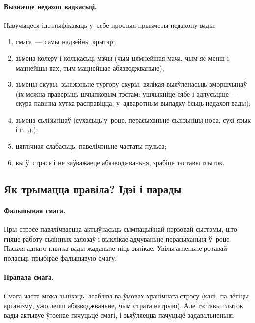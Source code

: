 \paragraph{Вызначце недахоп вадкасьці.} Навучыцеся ідэнтыфікаваць у~сябе простыя прыкметы недахопу вады:
\begin{enumerate}[itemindent=3em,labelwidth=1.5em,leftmargin=0pt,nosep]
  \item смага~--- самы надзейны крытэр;
  \item зьмена колеру і колькасьці мачы (чым цямнейшая мача, чым яе менш і мацнейшы пах, тым мацнейшае абязводжваньне);
  \item зьмены скуры: зьніжэньне тургору скуры, вялікая выяўленасьць зморшчынаў (іх можна праверыць шчыпковым тэстам: ушчыкніце сябе і адпусьціце~--- скура павінна хутка расправіцца, у~адваротным выпадку ёсьць недахоп вады);
  \item зьмена сьлізьніцаў (сухасьць у~роце, перасыханьне сьлізьніцы носа, сухі язык і г.~д.);
  \item цяглічная слабасьць, павелічэньне частаты пульса;
  \item вы ў~стрэсе і не заўважаеце абязводжваньня, зрабіце тэставы глыток.
\end{enumerate}

\subsection{Як трымацца правіла? Ідэі і парады}

\paragraph{Фальшывая смага.}
Пры стрэсе павялічваецца актыўнасьць сымпацыйнай нэрвовай сыстэмы, што гняце работу сьлінных залозаў і выклікае адчуваньне перасыханьня ў~роце. Пасьля аднаго глытка вады жаданьне піць зьнікае. Увільгатненьне ротавай поласьці прыбірае фальшывую смагу.


\paragraph{Прапала смага.}
Смага часта можа зьнікаць, асабліва ва ўмовах хранічнага стрэсу (калі, па лёгіцы арганізму, ужо лепш абязводжваньне, чым страта натрыю). Але тэставы глыток вады актывуе ўтоенае пачуцьцё смагі, і зьяўляецца пачуцьцё задавальненьня.

